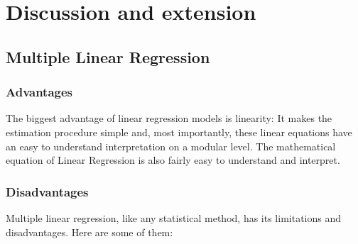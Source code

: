 \documentclass[a4paper]{article}
\theoremstyle{definition}
\begin{document}
\section{Discussion and extension}
\subsection{Multiple Linear Regression}
\subsubsection{Advantages}
The biggest advantage of linear regression models is linearity: It makes the estimation procedure simple and, most importantly, these linear equations have an easy to understand interpretation on a modular level. The mathematical equation of Linear Regression is also fairly easy to understand and interpret.
\subsubsection{Disadvantages}
Multiple linear regression, like any statistical method, has its limitations and disadvantages. Here are some of them:
\end{document}
